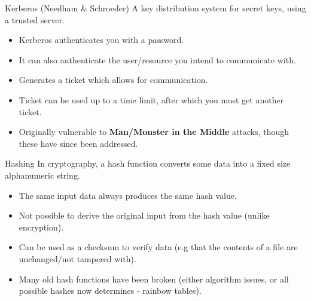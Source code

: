 \begin{definitionbox}{Kerberos (Needham \& Schroeder)}
    A key distribution system for secret keys, using a trusted server.
    \begin{itemize}
        \setlength\itemsep{0em}
        \item Kerberos authenticates you with a password.
        \item It can also authenticate the user/resource you intend to communicate with.
        \item Generates a ticket which allows for communication.
        \item Ticket can be used up to a time limit, after which you must get another ticket.
        \item Originally vulnerable to \textbf{Man/Monster in the Middle} attacks, though these have since been addressed.
    \end{itemize}
\end{definitionbox}
\begin{definitionbox}{Hashing}
    In cryptography, a hash function converts some data into a fixed size alphanumeric string.
    \begin{itemize}
        \setlength\itemsep{0em}
        \item The same input data always produces the same hash value.
        \item Not possible to derive the original input from the hash value (unlike encryption).
        \item Can be used as a checksum to verify data (e.g that the contents of a file are unchanged/not tampered with).
        \item Many old hash functions have been broken (either algorithm issues, or all possible hashes now determines - rainbow tables).
    \end{itemize}
\end{definitionbox}

